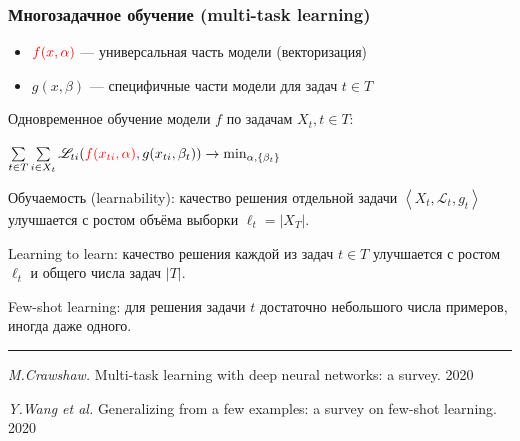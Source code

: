 \documentclass[fullscreen=true, bookmarks=true, hyperref={pdfencoding=unicode}]{beamer}
\begin{document}
\begin{frame}
  \frametitle{Многозадачное обучение (multi-task learning)}

  \begin{itemize}
    \item ${\color{red}f(x,\alpha)}$ — универсальная часть модели (векторизация)
    \item $g(x, \beta)$ — специфичные части модели для задач $t \in T$
  \end{itemize}

  Одновременное обучение модели $f$ по задачам $X_t, t \in T$:

  \begin{center}
  $\sum\limits_{t \in T} \sum\limits_{i \in X_t} \mathscr{L}_{ti} ({\color{red}f(x_{ti},\alpha)}, g(x_{ti}, \beta_t)) \to \min_{\alpha, \{\beta_t\}} $
  \end{center}

  \vspace{0.2cm}
  Обучаемость (learnability): качество решения отдельной задачи $\left< X_t, \mathscr{L}_t, g_t\right>$
  улучшается с ростом объёма выборки $\ell_t = |X_T|$.

  \vspace{0.2cm}
  Learning to learn: качество решения каждой из задач $t \in T$ улучшается с ростом $\ell_t$ и общего числа задач $|T|$.

  \vspace{0.2cm}
  Few-shot learning: для решения задачи $t$ достаточно небольшого числа примеров, иногда даже одного.

  \noindent\rule{8cm}{0.4pt}

  {\tiny
  {\it M.Crawshaw.} Multi-task learning with deep neural networks: a survey. 2020

  {\it Y.Wang et al.} Generalizing from a few examples: a survey on few-shot learning. 2020}
\end{frame}
\end{document}
